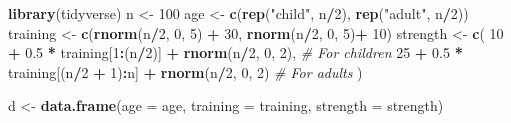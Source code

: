 \documentclass[
]{book}
\newenvironment{Shaded}{\begin{snugshade}}{\end{snugshade}}
\newcommand{\AttributeTok}[1]{\textcolor[rgb]{0.13,0.29,0.53}{#1}}
\newcommand{\CommentTok}[1]{\textcolor[rgb]{0.56,0.35,0.01}{\textit{#1}}}
\newcommand{\DecValTok}[1]{\textcolor[rgb]{0.00,0.00,0.81}{#1}}
\newcommand{\FloatTok}[1]{\textcolor[rgb]{0.00,0.00,0.81}{#1}}
\newcommand{\FunctionTok}[1]{\textcolor[rgb]{0.13,0.29,0.53}{\textbf{#1}}}
\newcommand{\NormalTok}[1]{#1}
\newcommand{\OtherTok}[1]{\textcolor[rgb]{0.56,0.35,0.01}{#1}}
\newcommand{\SpecialCharTok}[1]{\textcolor[rgb]{0.81,0.36,0.00}{\textbf{#1}}}
\newcommand{\StringTok}[1]{\textcolor[rgb]{0.31,0.60,0.02}{#1}}
\begin{document}
\begin{Shaded}
\begin{Highlighting}[]
\FunctionTok{library}\NormalTok{(tidyverse)}
\NormalTok{n }\OtherTok{\textless{}{-}} \DecValTok{100}
\NormalTok{age }\OtherTok{\textless{}{-}} \FunctionTok{c}\NormalTok{(}\FunctionTok{rep}\NormalTok{(}\StringTok{"child"}\NormalTok{, n}\SpecialCharTok{/}\DecValTok{2}\NormalTok{), }\FunctionTok{rep}\NormalTok{(}\StringTok{"adult"}\NormalTok{, n}\SpecialCharTok{/}\DecValTok{2}\NormalTok{))}
\NormalTok{training }\OtherTok{\textless{}{-}} \FunctionTok{c}\NormalTok{(}\FunctionTok{rnorm}\NormalTok{(n}\SpecialCharTok{/}\DecValTok{2}\NormalTok{, }\DecValTok{0}\NormalTok{, }\DecValTok{5}\NormalTok{) }\SpecialCharTok{+} \DecValTok{30}\NormalTok{, }\FunctionTok{rnorm}\NormalTok{(n}\SpecialCharTok{/}\DecValTok{2}\NormalTok{, }\DecValTok{0}\NormalTok{, }\DecValTok{5}\NormalTok{)}\SpecialCharTok{+} \DecValTok{10}\NormalTok{)}
\NormalTok{strength }\OtherTok{\textless{}{-}} \FunctionTok{c}\NormalTok{(}
  \DecValTok{10} \SpecialCharTok{+} \FloatTok{0.5} \SpecialCharTok{*}\NormalTok{ training[}\DecValTok{1}\SpecialCharTok{:}\NormalTok{(n}\SpecialCharTok{/}\DecValTok{2}\NormalTok{)] }\SpecialCharTok{+} \FunctionTok{rnorm}\NormalTok{(n}\SpecialCharTok{/}\DecValTok{2}\NormalTok{, }\DecValTok{0}\NormalTok{, }\DecValTok{2}\NormalTok{), }\CommentTok{\# For children}
  \DecValTok{25} \SpecialCharTok{+} \FloatTok{0.5} \SpecialCharTok{*}\NormalTok{ training[(n}\SpecialCharTok{/}\DecValTok{2} \SpecialCharTok{+} \DecValTok{1}\NormalTok{)}\SpecialCharTok{:}\NormalTok{n] }\SpecialCharTok{+} \FunctionTok{rnorm}\NormalTok{(n}\SpecialCharTok{/}\DecValTok{2}\NormalTok{, }\DecValTok{0}\NormalTok{, }\DecValTok{2}\NormalTok{) }\CommentTok{\# For adults}
\NormalTok{)}

\NormalTok{d }\OtherTok{\textless{}{-}} \FunctionTok{data.frame}\NormalTok{(}\AttributeTok{age =}\NormalTok{ age, }\AttributeTok{training =}\NormalTok{ training, }\AttributeTok{strength =}\NormalTok{ strength)}


\end{Highlighting}
\end{Shaded}
\end{document}
